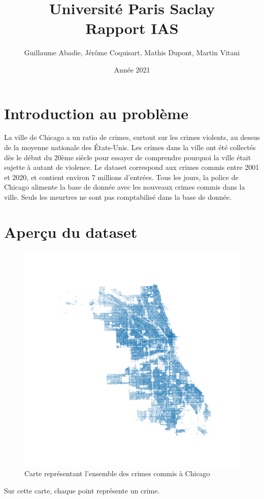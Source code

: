 \documentclass{article}
\title{\textbf{\Huge  Université Paris Saclay}\\ Rapport IAS}
\author{Guillaume Abadie, Jérôme Coquisart, Mathis Dupont, Martin Vitani}
\date{Année 2021}
\begin{document}
    \maketitle
    \tableofcontents

    \section{Introduction au problème}
    La ville de Chicago a un ratio de crimes, surtout sur les crimes violents, au dessus de la moyenne
    nationale des États-Unis.
    Les crimes dans la ville ont été collectés dès le début du 20ème siècle pour essayer de 
    comprendre pourquoi la ville était sujette à autant de violence.
    Le dataset correspond aux crimes commis entre 2001 et 2020, et contient environ 
    7 millions d'entrées.
    Tous les jours, la police de Chicago alimente la base de donnée avec les nouveaux crimes commis
    dans la ville. Seuls les meurtres ne sont pas comptabilisé dans la base de donnée.

    \section{Aperçu du dataset}
    \begin{figure}[H]
            \centering
	    \includegraphics[scale=.2]{Images/carte_chicago.png}
	    \caption{Carte représentant l'ensemble des crimes commis à Chicago}
    \end{figure}
    Sur cette carte, chaque point représente un crime.
\end{document}
